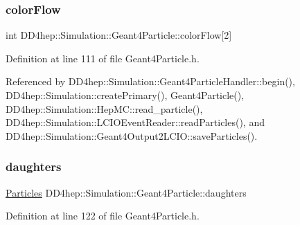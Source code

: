 \hypertarget{class_d_d4hep_1_1_simulation_1_1_geant4_particle_a739e02b76f159e26d92023cd1746c8cf}{}\label{class_d_d4hep_1_1_simulation_1_1_geant4_particle_a739e02b76f159e26d92023cd1746c8cf} 
\subsubsection{\texorpdfstring{color\+Flow}{colorFlow}}
{\footnotesize\ttfamily int D\+D4hep\+::\+Simulation\+::\+Geant4\+Particle\+::color\+Flow\mbox{[}2\mbox{]}}



Definition at line 111 of file Geant4\+Particle.\+h.



Referenced by D\+D4hep\+::\+Simulation\+::\+Geant4\+Particle\+Handler\+::begin(), D\+D4hep\+::\+Simulation\+::create\+Primary(), Geant4\+Particle(), D\+D4hep\+::\+Simulation\+::\+Hep\+M\+C\+::read\+\_\+particle(), D\+D4hep\+::\+Simulation\+::\+L\+C\+I\+O\+Event\+Reader\+::read\+Particles(), and D\+D4hep\+::\+Simulation\+::\+Geant4\+Output2\+L\+C\+I\+O\+::save\+Particles().

\hypertarget{class_d_d4hep_1_1_simulation_1_1_geant4_particle_a2d11cd13a703d52fa61142af97e243cb}{}\label{class_d_d4hep_1_1_simulation_1_1_geant4_particle_a2d11cd13a703d52fa61142af97e243cb} 
\subsubsection{\texorpdfstring{daughters}{daughters}}
{\footnotesize\ttfamily \hyperlink{class_d_d4hep_1_1_simulation_1_1_geant4_particle_a123ad778eff51ea80ce778d54776c072}{Particles} D\+D4hep\+::\+Simulation\+::\+Geant4\+Particle\+::daughters}



Definition at line 122 of file Geant4\+Particle.\+h.



